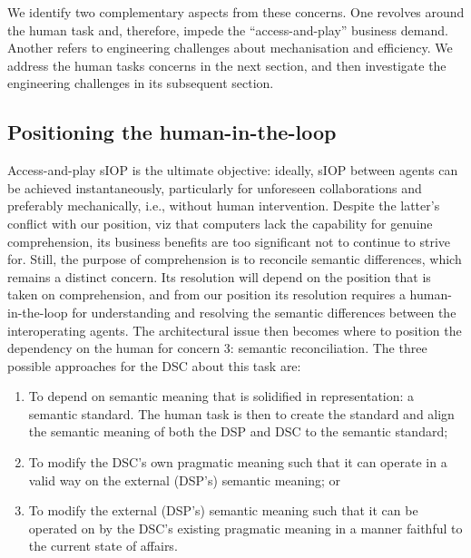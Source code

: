\documentclass[sort&compress,preprint,authoryear,3p,twocolumn]{elsarticle}
\providecommand{\tightlist}{%
  \setlength{\itemsep}{0pt}\setlength{\parskip}{0pt}}
\begin{document}
We identify two complementary aspects from these concerns. One revolves
around the human task and, therefore, impede the ``access-and-play''
business demand. Another refers to engineering challenges about
mechanisation and efficiency. We address the human tasks concerns in the
next section, and then investigate the engineering challenges in its
subsequent section.

\hypertarget{positioning-the-human-in-the-loop}{%
\subsection{Positioning the
human-in-the-loop}\label{positioning-the-human-in-the-loop}}

Access-and-play sIOP is the ultimate objective: ideally, sIOP between
agents can be achieved instantaneously, particularly for unforeseen
collaborations and preferably mechanically, i.e., without human
intervention. Despite the latter's conflict with our position, viz that
computers lack the capability for genuine comprehension, its business
benefits are too significant not to continue to strive for. Still, the
purpose of comprehension is to reconcile semantic differences, which
remains a distinct concern. Its resolution will depend on the position
that is taken on comprehension, and from our position its resolution
requires a human-in-the-loop for understanding and resolving the
semantic differences between the interoperating agents. The
architectural issue then becomes where to position the dependency on the
human for concern 3: semantic reconciliation. The three possible
approaches for the DSC about this task are:

\begin{enumerate}
\def\labelenumi{\roman{enumi}.}
\tightlist
\item
  To depend on semantic meaning that is solidified in representation: a
  semantic standard. The human task is then to create the standard and
  align the semantic meaning of both the DSP and DSC to the semantic
  standard;
\item
  To modify the DSC's own pragmatic meaning such that it can operate in
  a valid way on the external (DSP's) semantic meaning; or
\item
  To modify the external (DSP's) semantic meaning such that it can be
  operated on by the DSC's existing pragmatic meaning in a manner
  faithful to the current state of affairs.
\end{enumerate}
\end{document}
